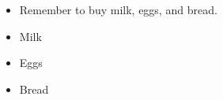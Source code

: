 \documentclass{article}
\begin{document}
\begin{itemize}
\item Remember to buy milk, eggs, and bread.
\item Milk
\item Eggs
\item Bread
\end{itemize}
\end{document}
